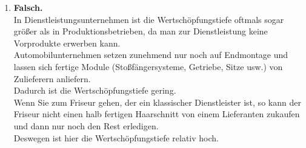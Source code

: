 {\begin{enumerate}
    \item \textbf{Falsch.} \\
    In Dienstleistungsunternehmen ist die Wertschöpfungstiefe oftmals sogar größer als in Produktionsbetrieben, da man zur Dienstleistung keine Vorprodukte erwerben kann.\\
    Automobilunternehmen setzen zunehmend nur noch auf Endmontage und lassen sich fertige Module (Stoßfängersysteme, Getriebe, Sitze usw.) von Zulieferern anliefern.\\
    Dadurch ist die Wertschöpfungstiefe gering.\\
    Wenn Sie zum Friseur gehen, der ein klassischer Dienstleister ist, so kann der Friseur nicht einen halb fertigen Haarschnitt von einem Lieferanten zukaufen und dann nur noch den Rest erledigen.\\
    Deswegen ist hier die Wertschöpfungstiefe relativ hoch.
\end{enumerate}
}
